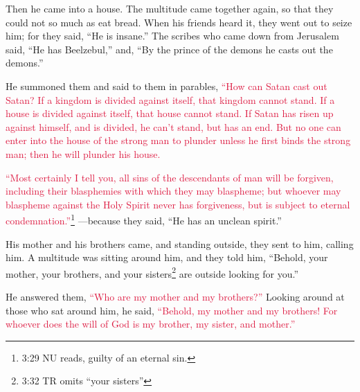 Then he came into a house.
\myverse{}The multitude came together again, so that they could not so much as eat bread.
\myverse{}When his friends heard it, they went out to seize him; for they said, “He
is insane.”
\myverse{}The scribes who came down from Jerusalem said, “He has Beelzebul,” and, “By
the prince of the demons he casts out the demons.”

\myverse{}He summoned them and said to them in parables,
\textcolor{crimson}{“How can Satan cast out Satan?
}
\myverse{}\textcolor{crimson}{If a kingdom is divided against itself, that kingdom cannot stand.
}
\myverse{}\textcolor{crimson}{If a house is divided against itself, that house cannot stand.
}
\myverse{}\textcolor{crimson}{If Satan has risen up against himself, and is divided, he can’t stand,
	but has an end.
}
\myverse{}\textcolor{crimson}{But no one can enter into the house of the strong man to plunder unless
	he first binds the strong man; then he will plunder his house.
}

\myverse{}\textcolor{crimson}{“Most certainly I tell you, all sins of the descendants of
	man will be forgiven, including their blasphemies with which they may blaspheme;
}
\myverse{}\textcolor{crimson}{but whoever may blaspheme against the Holy Spirit never has forgiveness,
	but is subject to eternal condemnation.”}\footnote{3:29 NU reads, guilty of an eternal sin.}
\myverse{}—because they said, “He has an unclean spirit.”

\myverse{}His mother and his brothers came, and standing outside, they
sent to him, calling him.
\myverse{}A multitude was sitting around him, and they told him, “Behold, your mother,
your brothers, and your sisters\footnote{3:32 TR omits “your sisters”} are outside looking for you.”

\myverse{}He answered them,
\textcolor{crimson}{“Who are my mother and my brothers?”}
\myverse{}Looking around at those who sat around him, he said,
\textcolor{crimson}{“Behold, my mother and my brothers!
}
\myverse{}\textcolor{crimson}{For whoever does the will of God is my brother, my sister, and mother.”}



